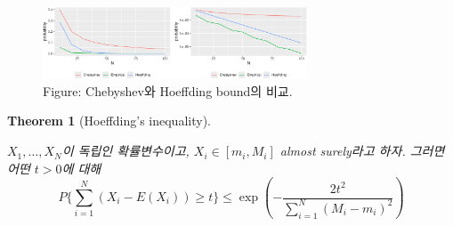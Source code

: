 \documentclass[
  13pt,
  letterpaper,
  DIV=11,
  numbers=noendperiod]{scrreprt}
\theoremstyle{definition}
\theoremstyle{plain}
\theoremstyle{definition}
\theoremstyle{plain}
\newtheorem{theorem}{Theorem}[chapter]
\theoremstyle{plain}
\theoremstyle{definition}
\theoremstyle{remark}
\begin{document}
\begin{figure}[th]

{\centering \includegraphics[width=0.7\textwidth,height=\textheight]{ineq_files/figure-pdf/unnamed-chunk-4-1.pdf}

}

\caption{Figure: Chebyshev와 Hoeffding bound의 비교.}

\end{figure}%

\begin{theorem}[Hoeffding's
inequality]\protect\hypertarget{thm-hoeffdingineq}{}\label{thm-hoeffdingineq}

\(X_1, \ldots, X_N\)이 독립인 확률변수이고, \(X_i \in [m_i, M_i]\)
almost surely라고 하자. 그러면 어떤 \(t>0\)에 대해 \[
P \{\sum_{i=1}^N (X_i - E(X_i))\geq t \} \leq \exp (- \frac{2t^2}{\sum_{i=1}^N (M_i - m_i)^2})
\]

\end{theorem}
\end{document}
